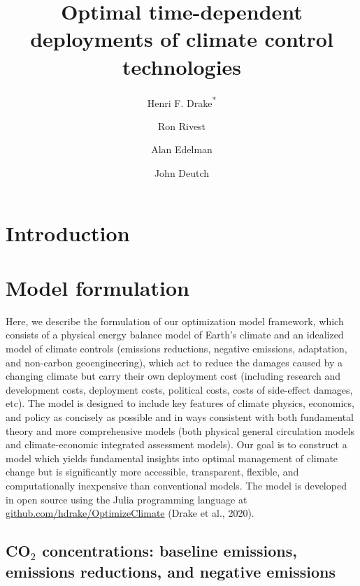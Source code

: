 \documentclass{article}
\title{Optimal time-dependent deployments of climate control technologies}
\author[1,2]{Henri F. Drake\textsuperscript{*}}
\author[1]{Ron Rivest}
\author[1]{Alan Edelman}
\author[1]{John Deutch}
\affil[1]{Massachusetts Institute of Technology, Cambridge, MA, USA}
\affil[2]{Woods Hole Oceanographic Institution, Woods Hole, MA, USA}
\date{}             %
\begin{document}
\maketitle

\section{Introduction}



\section{Model formulation}

Here, we describe the formulation of our optimization model framework, which consists of a physical energy balance model of Earth's climate and an idealized model of climate controls (emissions reductions, negative emissions, adaptation, and non-carbon geoengineering), which act to reduce the damages caused by a changing climate but carry their own deployment cost (including research and development costs, deployment costs, political costs, costs of side-effect damages, etc). The model is designed to include key features of climate physics, economics, and policy as concisely as possible and in ways consistent with both fundamental theory and more comprehensive models (both physical general circulation models and climate-economic integrated assessment models). Our goal is to construct a model which yields fundamental insights into optimal management of climate change but is significantly more accessible, transparent, flexible, and computationally inexpensive than conventional models. The model is developed in open source using the Julia programming language \citep{bezanson_julia:_2017} at \text\href{github.com/hdrake/OptimizeClimate}{github.com/hdrake/OptimizeClimate} (Drake et al., 2020).

\subsection{CO$_{2}$ concentrations: baseline emissions, emissions reductions, and negative emissions}
\end{document}

